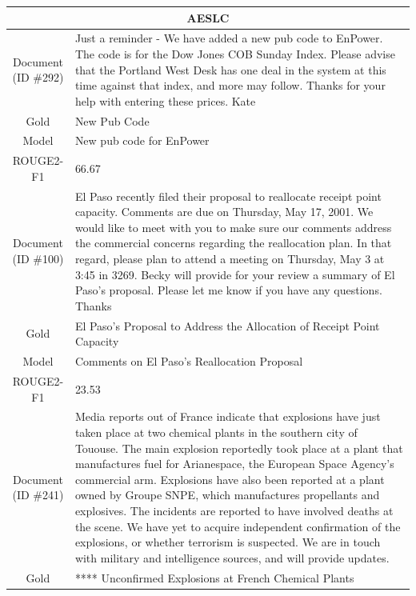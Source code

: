 \begin{table}[bth!]
\scriptsize
\centering
\renewcommand{\arraystretch}{1.3}
\begin{tabular}{c|p{}}
\hline
\multicolumn{2}{c}{AESLC} \\ \hline
\makecell{Document\\(ID \#292)} & 
Just a reminder - We have added a new pub code to EnPower. The code is for the Dow Jones COB Sunday Index. Please advise that the Portland West Desk has one deal in the system at this time against that index, and more may follow. Thanks for your help with entering these prices. Kate
\\ \hline
Gold & 
New Pub Code
\\ \hline
Model & 
New pub code for EnPower
\\ \hline
ROUGE2-F1 & 
66.67
\\ \hline
\makecell{Document\\(ID \#100)} & 
El Paso recently filed their proposal to reallocate receipt point capacity. Comments are due on Thursday, May 17, 2001. We would like to meet with you to make sure our comments address the commercial concerns regarding the reallocation plan. In that regard, please plan to attend a meeting on Thursday, May 3 at 3:45 in 3269. Becky will provide for your review a summary of El Paso's proposal. Please let me know if you have any questions. Thanks
\\ \hline
Gold & 
El Paso's Proposal to Address the Allocation of Receipt Point Capacity
\\ \hline
Model & 
Comments on El Paso's Reallocation Proposal
\\ \hline
ROUGE2-F1 & 
23.53
\\ \hline
\makecell{Document\\(ID \#241)} & 
Media reports out of France indicate that explosions have just taken place at two chemical plants in the southern city of Tououse. The main explosion reportedly took place at a plant that manufactures fuel for Arianespace, the European Space Agency's commercial arm. Explosions have also been reported at a plant owned by Groupe SNPE, which manufactures propellants and explosives. The incidents are reported to have involved deaths at the scene. We have yet to acquire independent confirmation of the explosions, or whether terrorism is suspected. We are in touch with military and intelligence sources, and will provide updates.
\\ \hline
Gold & 
**** Unconfirmed Explosions at French Chemical Plants

\end{tabular}
\end{table}
